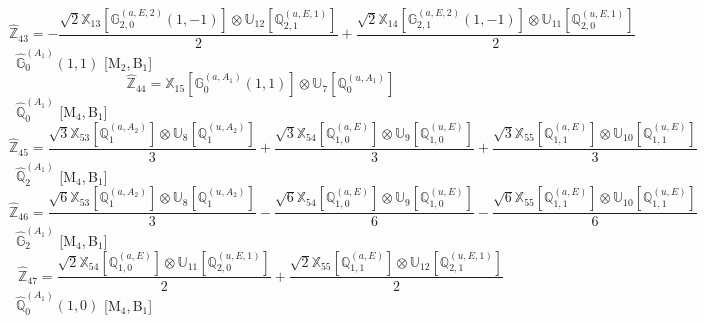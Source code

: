 \documentclass[fleqn,10pt,landscape]{article}
\begin{document}
\begin{itemize}
\begin{dmath*}
\hat{\mathbb{Z}}_{43}=- \frac{\sqrt{2} \mathbb{X}_{13}[\mathbb{G}_{2,0}^{(a,E,2)}(1,-1)] \otimes\mathbb{U}_{12}[\mathbb{Q}_{2,1}^{(u,E,1)}]}{2} + \frac{\sqrt{2} \mathbb{X}_{14}[\mathbb{G}_{2,1}^{(a,E,2)}(1,-1)] \otimes\mathbb{U}_{11}[\mathbb{Q}_{2,0}^{(u,E,1)}]}{2}
\end{dmath*}
\vspace{4mm}
\noindent {} $\,\,\,\hat{\mathbb{G}}_{0}^{(A_{1})}(1,1)$ [M$_{2}$,\,B$_{1}$]
\begin{dmath*}
\hat{\mathbb{Z}}_{44}=\mathbb{X}_{15}[\mathbb{G}_{0}^{(a,A_{1})}(1,1)] \otimes\mathbb{U}_{7}[\mathbb{Q}_{0}^{(u,A_{1})}]
\end{dmath*}
\vspace{4mm}
\noindent {} $\,\,\,\hat{\mathbb{Q}}_{0}^{(A_{1})}$ [M$_{4}$,\,B$_{1}$]
\begin{dmath*}
\hat{\mathbb{Z}}_{45}=\frac{\sqrt{3} \mathbb{X}_{53}[\mathbb{Q}_{1}^{(a,A_{2})}] \otimes\mathbb{U}_{8}[\mathbb{Q}_{1}^{(u,A_{2})}]}{3} + \frac{\sqrt{3} \mathbb{X}_{54}[\mathbb{Q}_{1,0}^{(a,E)}] \otimes\mathbb{U}_{9}[\mathbb{Q}_{1,0}^{(u,E)}]}{3} + \frac{\sqrt{3} \mathbb{X}_{55}[\mathbb{Q}_{1,1}^{(a,E)}] \otimes\mathbb{U}_{10}[\mathbb{Q}_{1,1}^{(u,E)}]}{3}
\end{dmath*}
\vspace{4mm}
\noindent {} $\,\,\,\hat{\mathbb{Q}}_{2}^{(A_{1})}$ [M$_{4}$,\,B$_{1}$]
\begin{dmath*}
\hat{\mathbb{Z}}_{46}=\frac{\sqrt{6} \mathbb{X}_{53}[\mathbb{Q}_{1}^{(a,A_{2})}] \otimes\mathbb{U}_{8}[\mathbb{Q}_{1}^{(u,A_{2})}]}{3} - \frac{\sqrt{6} \mathbb{X}_{54}[\mathbb{Q}_{1,0}^{(a,E)}] \otimes\mathbb{U}_{9}[\mathbb{Q}_{1,0}^{(u,E)}]}{6} - \frac{\sqrt{6} \mathbb{X}_{55}[\mathbb{Q}_{1,1}^{(a,E)}] \otimes\mathbb{U}_{10}[\mathbb{Q}_{1,1}^{(u,E)}]}{6}
\end{dmath*}
\vspace{4mm}
\noindent {} $\,\,\,\hat{\mathbb{G}}_{2}^{(A_{1})}$ [M$_{4}$,\,B$_{1}$]
\begin{dmath*}
\hat{\mathbb{Z}}_{47}=\frac{\sqrt{2} \mathbb{X}_{54}[\mathbb{Q}_{1,0}^{(a,E)}] \otimes\mathbb{U}_{11}[\mathbb{Q}_{2,0}^{(u,E,1)}]}{2} + \frac{\sqrt{2} \mathbb{X}_{55}[\mathbb{Q}_{1,1}^{(a,E)}] \otimes\mathbb{U}_{12}[\mathbb{Q}_{2,1}^{(u,E,1)}]}{2}
\end{dmath*}
\vspace{4mm}
\noindent {} $\,\,\,\hat{\mathbb{Q}}_{0}^{(A_{1})}(1,0)$ [M$_{4}$,\,B$_{1}$]
\begin{dmath*}

\end{dmath*}
\end{itemize}
\end{document}
